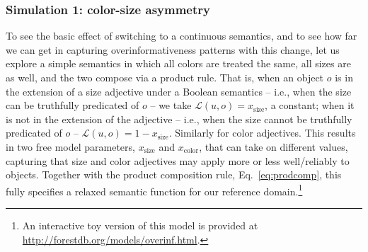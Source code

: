 \documentclass[11pt]{article}
\begin{document}
\subsubsection{Simulation 1: color-size asymmetry}
\label{sec:colorsizesimulation}
To see the basic effect of switching to a continuous semantics, and to see how far we can get in capturing overinformativeness patterns with this change, let us explore a simple semantics in which all colors are treated the same, all sizes are as well, and the two compose via a product rule.
That is, when an object $o$ is in the extension of a size adjective under a Boolean semantics -- i.e., when the size can be truthfully predicated of $o$ -- we take $\mathcal{L}(u,o) = x_{\text{size}}$, a constant; when it is not in the extension of the adjective  -- i.e., when the size cannot be truthfully predicated of $o$ --  $\mathcal{L}(u,o) = 1 - x_{\text{size}}$. 
Similarly for color adjectives. 
This results in two free model parameters, $x_{\text{size}}$ and $x_{\text{color}}$, that can take on different values, capturing that size and color adjectives may apply more or less well/reliably to objects.
Together with the product composition rule, Eq.~\ref{eq:prodcomp}, this fully specifies a relaxed semantic function for our reference domain.\footnote{An interactive toy version of this model is provided at \url{http://forestdb.org/models/overinf.html}.}
\end{document}

